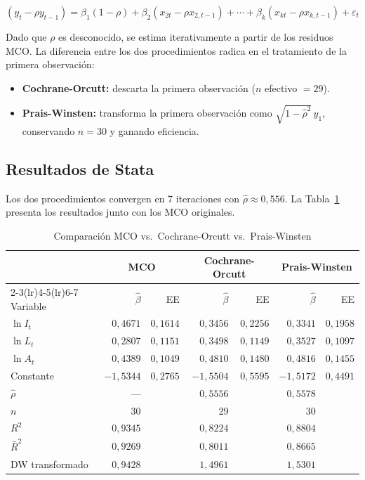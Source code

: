 \documentclass[12pt,a4paper]{article}
\begin{document}
\begin{equation}
  (y_t - \rho y_{t-1}) = \beta_1(1-\rho) + \beta_2(x_{2t}-\rho x_{2,t-1})
  + \cdots + \beta_k(x_{kt}-\rho x_{k,t-1}) + \varepsilon_t
  \label{eq:qdif}
\end{equation}

Dado que $\rho$ es desconocido, se estima iterativamente a partir de los
residuos MCO. La diferencia entre los dos procedimientos radica en el
tratamiento de la primera observación:

\begin{itemize}
  \item \textbf{Cochrane-Orcutt:} descarta la primera observación ($n$ efectivo $= 29$).
  \item \textbf{Prais-Winsten:} transforma la primera observación como
        $\sqrt{1-\hat\rho^2}\,y_1$, conservando $n=30$ y ganando eficiencia.
\end{itemize}

\subsection{Resultados de Stata}

Los dos procedimientos convergen en 7 iteraciones con $\hat\rho \approx 0{,}556$.
La Tabla~\ref{tab:prais} presenta los resultados junto con los MCO originales.

\begin{table}[H]
  \centering
  \caption{Comparación MCO vs.\ Cochrane-Orcutt vs.\ Prais-Winsten}
  \label{tab:prais}
  \small
  \begin{tabular}{l rr rr rr}
    \toprule
    & \multicolumn{2}{c}{MCO} & \multicolumn{2}{c}{Cochrane-Orcutt} & \multicolumn{2}{c}{Prais-Winsten} \\
    \cmidrule(lr){2-3}\cmidrule(lr){4-5}\cmidrule(lr){6-7}
    Variable & $\hat\beta$ & EE & $\hat\beta$ & EE & $\hat\beta$ & EE \\
    \midrule
    $\ln I_t$ & $0{,}4671$ & $0{,}1614$ & $0{,}3456$ & $0{,}2256$ & $0{,}3341$ & $0{,}1958$ \\
    $\ln L_t$ & $0{,}2807$ & $0{,}1151$ & $0{,}3498$ & $0{,}1149$ & $0{,}3527$ & $0{,}1097$ \\
    $\ln A_t$ & $0{,}4389$ & $0{,}1049$ & $0{,}4810$ & $0{,}1480$ & $0{,}4816$ & $0{,}1455$ \\
    Constante & $-1{,}5344$ & $0{,}2765$ & $-1{,}5504$ & $0{,}5595$ & $-1{,}5172$ & $0{,}4491$ \\
    \midrule
    $\hat\rho$ & --- & & $0{,}5556$ & & $0{,}5578$ & \\
    $n$ & 30 & & 29 & & 30 & \\
    $R^2$ & $0{,}9345$ & & $0{,}8224$ & & $0{,}8804$ & \\
    $\bar R^2$ & $0{,}9269$ & & $0{,}8011$ & & $0{,}8665$ & \\
    DW transformado & $0{,}9428$ & & $1{,}4961$ & & $1{,}5301$ & \\
    \bottomrule
  \end{tabular}
\end{table}
\end{document}
